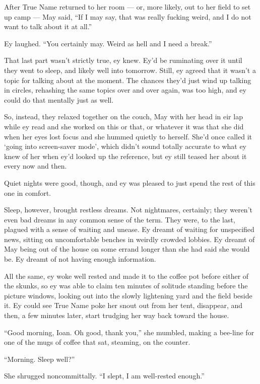 After True Name returned to her room — or, more likely, out to her field to set up camp — May said, ``If I may say, that was really fucking weird, and I do not want to talk about it at all.''

Ey laughed. ``You certainly may. Weird as hell and I need a break.''

That last part wasn't strictly true, ey knew. Ey'd be ruminating over it until they went to sleep, and likely well into tomorrow. Still, ey agreed that it wasn't a topic for talking about at the moment. The chances they'd just wind up talking in circles, rehashing the same topics over and over again, was too high, and ey could do that mentally just as well.

So, instead, they relaxed together on the couch, May with her head in eir lap while ey read and she worked on this or that, or whatever it was that she did when her eyes lost focus and she hummed quietly to herself. She'd once called it `going into screen-saver mode', which didn't sound totally accurate to what ey knew of her when ey'd looked up the reference, but ey still teased her about it every now and then.

Quiet nights were good, though, and ey was pleased to just spend the rest of this one in comfort.

Sleep, however, brought restless dreams. Not nightmares, certainly; they weren't even bad dreams in any common sense of the term. They were, to the last, plagued with a sense of waiting and unease. Ey dreamt of waiting for unspecified news, sitting on uncomfortable benches in weirdly crowded lobbies. Ey dreamt of May being out of the house on some errand longer than she had said she would be. Ey dreamt of not having enough information.

All the same, ey woke well rested and made it to the coffee pot before either of the skunks, so ey was able to claim ten minutes of solitude standing before the picture windows, looking out into the slowly lightening yard and the field beside it. Ey could see True Name poke her snout out from her tent, disappear, and then, a few minutes later, start trudging her way back toward the house.

``Good morning, Ioan. Oh good, thank you,'' she mumbled, making a bee-line for one of the mugs of coffee that sat, steaming, on the counter.

``Morning. Sleep well?''

She shrugged noncommittally. ``I slept, I am well-rested enough.''


